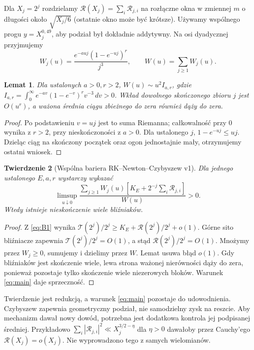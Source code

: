 \documentclass[11pt,a4paper]{article}
\newtheorem{tw}{Twierdzenie}[section]
\newtheorem{lem}[tw]{Lemat}
\newcommand{\R}{\mathcal R}
\newcommand{\T}{\mathcal T}
\begin{document}
Dla $X_j=2^j$ rozdzielamy $\R(X_j)=\sum_i\R_{j,i}$ na rozłączne okna w zmiennej $m$ o długości około $\sqrt{X_j/6}$ (ostatnie okno może być krótsze). Używamy wspólnego progu $y=X_j^{0{,}49}$, aby podział był dokładnie addytywny. Na osi dyadycznej przyjmujemy
\[
 W_j(u)=\frac{e^{-auj}(1-e^{-uj})^r}{j^3},\qquad W(u)=\sum_{j\ge1}W_j(u).
\]
\begin{lem}Dla ustalonych $a>0,r>2$, $W(u)\sim u^2 I_{a,r}$, gdzie $I_{a,r}=\int_0^\infty e^{-av}(1-e^{-v})^r v^{-3}\,dv>0$. Wkład dowolnego skończonego zbioru $j$ jest $O(u^r)$, a ważona średnia ciągu zbieżnego do zera również dąży do zera.\end{lem}
\begin{proof}Po podstawieniu $v=uj$ jest to suma Riemanna; całkowalność przy 0 wynika z $r>2$, przy nieskończoności z $a>0$. Dla ustalonego $j$, $1-e^{-uj}\le uj$. Dzieląc ciąg na skończony początek oraz ogon jednostajnie mały, otrzymujemy ostatni wniosek.\end{proof}
\begin{tw}[Wspólna bariera RK--Newton--Czybyszew v1]\label{th:main}
Dla jednego ustalonego $E,a,r$ wystarczy wykazać
\begin{equation}\label{eq:main}
 \boxed{\limsup_{u\downarrow0}\frac{\sum_{j\ge1}W_j(u)\left[K_E+2^{-j}\sum_i\R_{j,i}\right]}{W(u)}>0.}
\end{equation}
Wtedy istnieje nieskończenie wiele bliźniaków.\end{tw}
\begin{proof}Z \eqref{eq:B1} wynika $\T(2^j)/2^j\ge K_E+\R(2^j)/2^j+o(1)$. Górne sito bliźniacze zapewnia $\T(2^j)/2^j=O(1)$, a stąd $\R(2^j)/2^j=O(1)$. Mnożymy przez $W_j\ge0$, sumujemy i dzielimy przez $W$. Lemat usuwa błąd $o(1)$. Gdy bliźniaków jest skończenie wiele, lewa strona ważonej nierówności dąży do zera, ponieważ pozostaje tylko skończenie wiele niezerowych bloków. Warunek \eqref{eq:main} daje sprzeczność.\end{proof}
Twierdzenie jest redukcją, a warunek \eqref{eq:main} pozostaje do udowodnienia. Czybyszew zapewnia geometryczny podział, nie samodzielny zysk na reszcie. Aby mechanizm dawał nowy dowód, potrzebna jest dodatkowa kontrola jej podpisanej średniej. Przykładowo $\sum_i|\R_{j,i}|^2\ll X_j^{3/2-\eta}$ dla $\eta>0$ dawałoby przez Cauchy'ego $\R(X_j)=o(X_j)$. Nie wyprowadzono tego z samych wielomianów.
\end{document}
